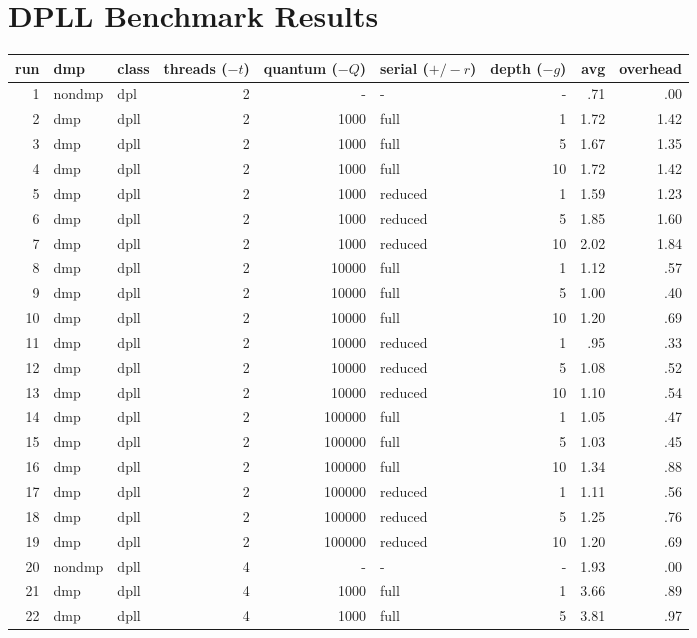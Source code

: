 \chapter{DPLL Benchmark Results}

\begin{center}
\begin{small}
\begin{longtable}{rllrrlrrr}
\hline
run & dmp & class & threads ($-t$) & quantum ($-Q$) & serial ($+/-r$) & depth ($-g$) & avg & overhead\\
\hline
 1 & nondmp & dpl & 2 & - & - & - & .71 & .00\\
 2 & dmp & dpll & 2 & 1000 & full & 1 & 1.72 & 1.42\\
 3 & dmp & dpll & 2 & 1000 & full & 5 & 1.67 & 1.35\\
 4 & dmp & dpll & 2 & 1000 & full & 10 & 1.72 & 1.42\\
 5 & dmp & dpll & 2 & 1000 & reduced & 1 & 1.59 & 1.23\\
 6 & dmp & dpll & 2 & 1000 & reduced & 5 & 1.85 & 1.60\\
 7 & dmp & dpll & 2 & 1000 & reduced & 10 & 2.02 & 1.84\\
 8 & dmp & dpll & 2 & 10000 & full & 1 & 1.12 & .57\\
 9 & dmp & dpll & 2 & 10000 & full & 5 & 1.00 & .40\\
10 & dmp & dpll & 2 & 10000 & full & 10 & 1.20 & .69\\
11 & dmp & dpll & 2 & 10000 & reduced & 1 & .95 & .33\\
12 & dmp & dpll & 2 & 10000 & reduced & 5 & 1.08 & .52\\
13 & dmp & dpll & 2 & 10000 & reduced & 10 & 1.10 & .54\\
14 & dmp & dpll & 2 & 100000 & full & 1 & 1.05 & .47\\
15 & dmp & dpll & 2 & 100000 & full & 5 & 1.03 & .45\\
16 & dmp & dpll & 2 & 100000 & full & 10 & 1.34 & .88\\
17 & dmp & dpll & 2 & 100000 & reduced & 1 & 1.11 & .56\\
18 & dmp & dpll & 2 & 100000 & reduced & 5 & 1.25 & .76\\
19 & dmp & dpll & 2 & 100000 & reduced & 10 & 1.20 & .69\\
\hline
20 & nondmp & dpll & 4 & - & - & - & 1.93 & .00\\
21 & dmp & dpll & 4 & 1000 & full & 1 & 3.66 & .89\\
22 & dmp & dpll & 4 & 1000 & full & 5 & 3.81 & .97\\

\end{longtable}
\end{small}
\end{center}
